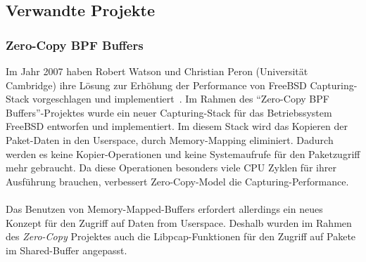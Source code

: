 \subsection{Verwandte Projekte}
\subsubsection*{Zero-Copy BPF Buffers}\label{sec:verw_bpf}
Im Jahr 2007 haben Robert Watson und Christian Peron (Universität Cambridge)
ihre Lösung zur Erhöhung  der Performance von FreeBSD Capturing-Stack
vorgeschlagen und implementiert~\cite{zerocopy}.  Im Rahmen des ``Zero-Copy BPF
Buffers''-Projektes wurde ein neuer Capturing-Stack für das Betriebssystem
FreeBSD entworfen und implementiert.  Im diesem Stack wird das Kopieren der
Paket-Daten in den Userspace, durch Memory-Mapping eliminiert. Dadurch  werden
es keine Kopier-Operationen und keine Systemaufrufe für den Paketzugriff mehr
gebraucht. Da diese Operationen besonders viele CPU Zyklen für ihrer Ausführung
brauchen, verbessert Zero-Copy-Model die Capturing-Performance.\\\\
%
Das Benutzen von Memory-Mapped-Buffers erfordert allerdings ein neues Konzept
für den Zugriff auf Daten from Userspace. Deshalb wurden im Rahmen des
\emph{Zero-Copy} Projektes auch die Libpcap-Funktionen für den Zugriff auf
Pakete im Shared-Buffer angepasst.


